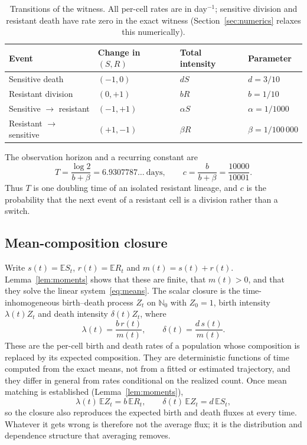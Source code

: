 \documentclass[11pt,a4paper]{article}
\theoremstyle{plain}
\theoremstyle{definition}
\theoremstyle{remark}
\newcommand{\N}{\mathbb N}
\newcommand{\EE}{\mathbb E}
\begin{document}
\begin{table}[ht]
\centering
\caption{Transitions of the witness. All per-cell rates are in day$^{-1}$; sensitive division and resistant death have rate zero in the exact witness (Section~\ref{sec:numerics} relaxes this numerically).}
\label{tab:rates}
\begin{tabular}{llll}
\toprule
Event & Change in $(S,R)$ & Total intensity & Parameter\\
\midrule
Sensitive death & $(-1,0)$ & $dS$ & $d=3/10$\\
Resistant division & $(0,+1)$ & $bR$ & $b=1/10$\\
Sensitive $\to$ resistant & $(-1,+1)$ & $\alpha S$ & $\alpha=1/1000$\\
Resistant $\to$ sensitive & $(+1,-1)$ & $\beta R$ & $\beta=1/100\,000$\\
\bottomrule
\end{tabular}
\end{table}

The observation horizon and a recurring constant are
\begin{equation}\label{eq:horizon}
T=\frac{\log2}{b+\beta}=6.9307787\ldots\ \text{days},\qquad c=\frac b{b+\beta}=\frac{10000}{10001}.
\end{equation}
Thus $T$ is one doubling time of an isolated resistant lineage, and $c$ is the probability that the next event of a resistant cell is a division rather than a switch.

\subsection{Mean-composition closure}
Write $s(t)=\EE S_t$, $r(t)=\EE R_t$ and $m(t)=s(t)+r(t)$. Lemma~\ref{lem:moments} shows that these are finite, that $m(t)>0$, and that they solve the linear system~\eqref{eq:means}. The scalar closure is the time-inhomogeneous birth--death process $Z_t$ on $\N_0$ with $Z_0=1$, birth intensity $\lambda(t)Z_t$ and death intensity $\delta(t)Z_t$, where
\begin{equation}\label{eq:rates}
\lambda(t)=\frac{b\,r(t)}{m(t)},\qquad \delta(t)=\frac{d\,s(t)}{m(t)} .
\end{equation}
These are the per-cell birth and death rates of a population whose composition is replaced by its expected composition. They are deterministic functions of time computed from the exact means, not from a fitted or estimated trajectory, and they differ in general from rates conditional on the realized count. Once mean matching is established (Lemma~\ref{lem:moments}),
\[
\lambda(t)\,\EE Z_t=b\,\EE R_t,\qquad \delta(t)\,\EE Z_t=d\,\EE S_t ,
\]
so the closure also reproduces the expected birth and death fluxes at every time. Whatever it gets wrong is therefore not the average flux; it is the distribution and dependence structure that averaging removes.
\end{document}
